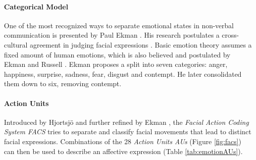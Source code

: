 \paragraph{Categorical Model}
One of the most recognized ways to separate emotional states in non-verbal communication is presented by Paul Ekman \cite{ekman1987universals} \cite{ekman2013emotion}. His research postulates a cross-cultural agreement in judging facial expressions \cite{ekman1987universals}. Basic emotion theory assumes a fixed amount of human emotions, which is also believed and postulated by Ekman and Russell \cite{ekman1992basic} \cite{russell2006}. Ekman proposes a split into seven categories: anger, happiness, surprise, sadness, fear, disgust and contempt. He later consolidated them down to six, removing contempt. 




\paragraph{Action Units}
\label{subsub:au}

Introduced by Hjortsjö \cite{hjortsjo1969man} and further refined by Ekman \cite{friesen1978facial}, the \emph{Facial Action Coding System FACS} tries to separate and classify facial movements that lead to distinct facial expressions. Combinations of the 28 \emph{Action Units AUs} (Figure \ref{fig:facs}) can then be used to describe an affective expression (Table \ref{tab:emotionAUs}).

